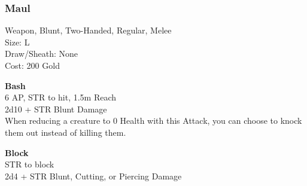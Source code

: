 \subsubsection{Maul}\label{weapon:maul}
Weapon, Blunt, Two-Handed, Regular, Melee\\
Size: L\\
Draw/Sheath: None\\
Cost: 200 Gold

\textbf{Bash}\\
6 AP, STR to hit, 1.5m Reach\\
2d10 + STR Blunt Damage\\
When reducing a creature to 0 Health with this Attack, you can choose to knock them out instead of killing them.

\textbf{Block}\\
STR to block\\
2d4 + \texttimes STR Blunt, Cutting, or Piercing Damage
